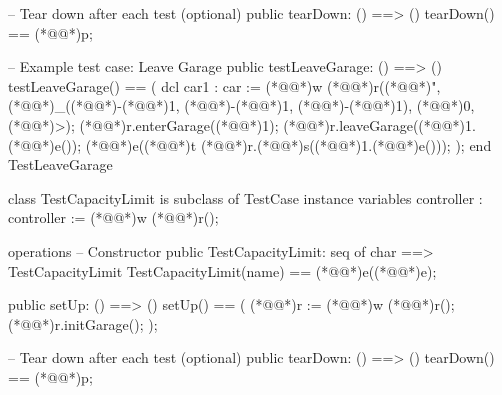 \documentclass[a4paper]{article}
\begin{document}
\begin{vdm_al}
    -- Tear down after each test (optional)
    public tearDown: () ==> ()
    tearDown() == (*@@*)p;

  
    -- Example test case: Leave Garage
    public testLeaveGarage: () ==> ()
    testLeaveGarage() ==
    (
        dcl car1 : car := (*@@*)w (*@@*)r((*@@*)", (*@@*)_((*@\vdmnotcovered{}@*)-(*@\vdmnotcovered{}@*)1, (*@\vdmnotcovered{}@*)-(*@\vdmnotcovered{}@*)1, (*@\vdmnotcovered{}@*)-(*@\vdmnotcovered{}@*)1), (*@\vdmnotcovered{}@*)0, (*@@*)>);
        (*@@*)r.enterGarage((*@@*)1);
        (*@@*)r.leaveGarage((*@@*)1.(*@@*)e());
        (*@@*)e((*@@*)t (*@@*)r.(*@@*)s((*@@*)1.(*@@*)e()));
    );
end TestLeaveGarage

class TestCapacityLimit is subclass of TestCase
instance variables
    controller : controller := (*@@*)w (*@@*)r();

operations
    -- Constructor
    public TestCapacityLimit: seq of char ==> TestCapacityLimit
    TestCapacityLimit(name) == (*@@*)e((*@@*)e);

    public setUp: () ==> ()
    setUp() == 
    (
        (*@@*)r := (*@@*)w (*@@*)r();
        (*@@*)r.initGarage();
    );

    -- Tear down after each test (optional)
    public tearDown: () ==> ()
    tearDown() == (*@@*)p;


\end{vdm_al}
\end{document}
